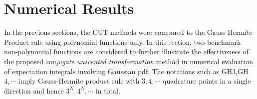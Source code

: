 \documentclass[letterpaper, 10 pt, conference]{IEEEtran}  %
\newcommand{\comments}[1]{}
\begin{document}
  




\section{Numerical Results}
In the previous sections, the CUT methods were compared to the Gauss Hermite Product rule using polynomial functions only. In this section,  two benchmark non-polynomial functions are considered to further illustrate the effectiveness of the proposed \textit{conjugate unscented transformation} method in numerical evaluation of expectation integrals involving Gaussian pdf. The notations such as GH$3$,GH$4,\cdots$ imply Gauss-Hermite product rule with $3,4,\cdots$ quadrature points in a single direction and hence $3^N,4^N,\cdots$ in total.

\end{document}
